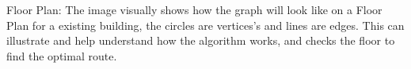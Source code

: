 Floor Plan:
The image visually shows how the graph will look like on a Floor Plan for a existing building, the circles are vertices's and lines are edges. This can illustrate and help understand how the algorithm works, and checks the floor to find the optimal route. 